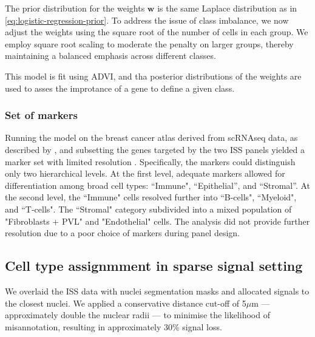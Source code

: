 The prior distribution for the weights $\mathbf{w}$ is the same Laplace distribution as in \cref{eq:logistic-regression-prior}. To address the issue of class imbalance, we now adjust the weights using the square root of the number of cells in each group. We employ square root scaling to moderate the penalty on larger groups, thereby maintaining a balanced emphasis across different classes.

This model is fit using \ac{ADVI}, and tha posterior distributions of the weights are used to asses the improtance of a gene to define a given class. 


\subsubsection*{Set of markers}

Running the model on the breast cancer atlas derived from \ac{scRNAseq} data, as described by \textcite{Wu2021-uq}, and subsetting the genes targeted by the two \ac{ISS} panels yielded a marker set with limited resolution . Specifically, the markers could distinguish only two hierarchical levels. At the first level, adequate markers allowed for differentiation among broad cell types: ``Immune", ``Epithelial'', and ``Stromal''. At the second level, the ``Immune" cells resolved further into ``B-cells", ``Myeloid", and ``T-cells". The ``Stromal" category subdivided into a mixed population of "Fibroblasts + PVL" and "Endothelial" cells. The analysis did not provide further resolution due to a poor choice of markers during panel design.

\subsection{Cell type assignmment in sparse signal setting}
\label{sec:modalities-celltype}

We overlaid the ISS data with nuclei segmentation masks and allocated signals to the closest nuclei. We applied a conservative distance cut-off of 5$\mu$m — approximately double the nuclear radii — to minimise the likelihood of misannotation, resulting in approximately 30\% signal loss.

